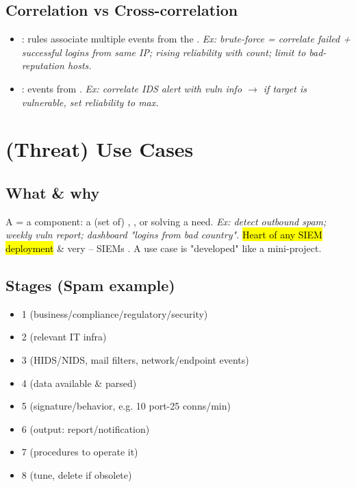 \subsection{Correlation vs Cross-correlation}
\begin{itemize}
\item {}: rules associate multiple events from the . \textit{Ex: brute-force = correlate failed + successful logins from same IP; rising reliability with count; limit to bad-reputation hosts.}
\item {}: events from . \textit{Ex: correlate IDS alert with vuln info $\to$ if target is vulnerable, set reliability to max.}
\end{itemize}

\section{(Threat) Use Cases}

\subsection{What \& why}
A  = a  component: a (set of) , ,  or  solving a need. \textit{Ex: detect outbound spam; weekly vuln report; dashboard "logins from bad country".}
\hl{Heart of any SIEM deployment} \& very  -- SIEMs . A use case is "developed" like a mini-project.

\subsection{Stages (Spam example)}
\begin{itemize}
\item 1  (business/compliance/regulatory/security)
\item 2  (relevant IT infra)
\item 3  (HIDS/NIDS, mail filters, network/endpoint events)
\item 4  (data available \& parsed)
\item 5  (signature/behavior, e.g. 10 port-25 conns/min)
\item 6  (output: report/notification)
\item 7  (procedures to operate it)
\item 8  (tune, delete if obsolete)
\end{itemize}

